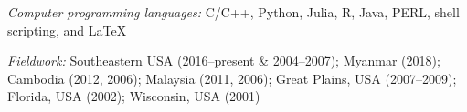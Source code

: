 \myHangIndent
{\sffamily\itshape Computer programming languages:} C/C++, Python, Julia, R, Java,
PERL, shell scripting, and \LaTeX

\myHangIndent
{\sffamily\itshape Fieldwork:}
Southeastern USA (2016--present \& 2004--2007);
Myanmar (2018);
Cambodia (2012, 2006);
Malaysia (2011, 2006);
Great Plains, USA (2007--2009);
Florida, USA (2002);
Wisconsin, USA (2001)
